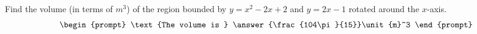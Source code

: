 \documentclass{ximera}
\author{Gregory Hartman \and Matthew Carr}
\begin{document}
\begin{exercise}






Find the volume (in terms of $\unit{m}^3$) of the region bounded by $y=x^2-2x+2$ and $y=2x-1$ rotated around the $x$-axis.
\[
\begin{prompt}
\text{The volume is } \answer{\frac{104\pi}{15}}\unit{m}^3
\end{prompt}
\]




\end{exercise}
\end{document}
